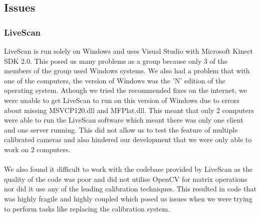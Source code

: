 \documentclass{article}
\begin{document}
\subsection{Issues}
\subsubsection{LiveScan}
LiveScan is run solely on Windows and uses Visual Studio with Microsoft Kinect SDK 2.0. This posed us many problems as a group because only 3 of the members of the group used Windows systems. We also had a problem that with one of the computers, the version of Windows was the 'N' edition of the operating system. Athough we tried the recommended fixes on the internet, we were unable to get LiveScan to run on this version of Windows due to errors about missing MSVCP120.dll and MFPlat.dll. This meant that only 2 computers were able to run the LiveScan software which meant there was only one client and one server running. This did not allow us to test the feature of multiple calibrated cameras and also hindered our development that we were only able to work on 2  computers.
\\\\
We also found it difficult to work with the codebase provided by LiveScan as the quality of the code was poor and did not utilise OpenCV for matrix operations nor did it use any of the leading calibration techniques. This resulted in code that was highly fragile and highly coupled which posed us issues when we were trying to perform tasks like replacing the calibration system.
\end{document}
